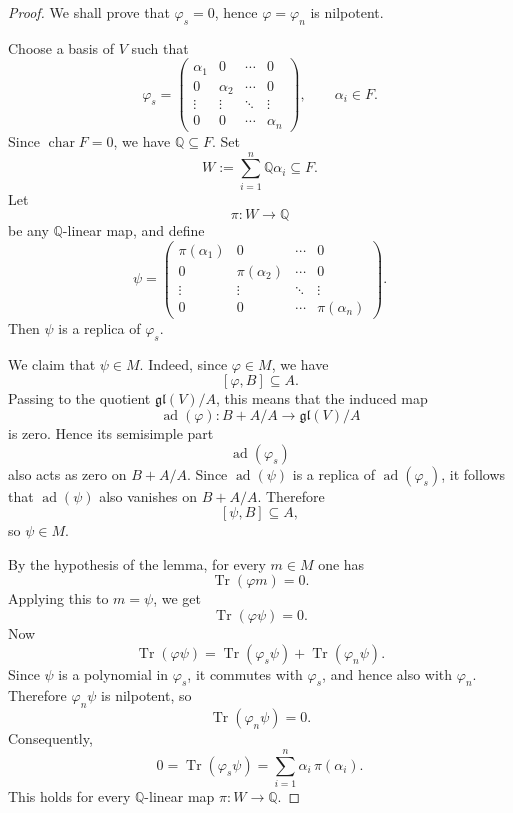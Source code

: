 \begin{proof}
    We shall prove that $\varphi_s=0$, hence $\varphi=\varphi_n$ is nilpotent.

    Choose a basis of $V$ such that
    \[
        \varphi_s=
        \begin{pmatrix}
            \alpha_1 & 0        & \cdots & 0        \\
            0        & \alpha_2 & \cdots & 0        \\
            \vdots   & \vdots   & \ddots & \vdots   \\
            0        & 0        & \cdots & \alpha_n
        \end{pmatrix},
        \qquad \alpha_i\in F.
    \]
    Since $\operatorname{char}F=0$, we have $\mathbb{Q}\subseteq F$. Set
    \[
        W:=\sum_{i=1}^n \mathbb{Q}\alpha_i\subseteq F.
    \]
    Let
    \[
        \pi:W\to \mathbb{Q}
    \]
    be any $\mathbb{Q}$-linear map, and define
    \[
        \psi=
        \begin{pmatrix}
            \pi(\alpha_1) & 0             & \cdots & 0             \\
            0             & \pi(\alpha_2) & \cdots & 0             \\
            \vdots        & \vdots        & \ddots & \vdots        \\
            0             & 0             & \cdots & \pi(\alpha_n)
        \end{pmatrix}.
    \]
    Then $\psi$ is a replica of $\varphi_s$.

    We claim that $\psi\in M$. Indeed, since $\varphi\in M$, we have
    \[
        [\varphi,B]\subseteq A.
    \]
    Passing to the quotient $\mathfrak{gl}(V)/A$, this means that the induced map
    \[
        \operatorname{ad}(\varphi):B+A/A\to \mathfrak{gl}(V)/A
    \]
    is zero. Hence its semisimple part
    \[
        \operatorname{ad}(\varphi_s)
    \]
    also acts as zero on $B+A/A$. Since $\operatorname{ad}(\psi)$ is a replica of $\operatorname{ad}(\varphi_s)$, it follows that $\operatorname{ad}(\psi)$ also vanishes on $B+A/A$. Therefore
    \[
        [\psi,B]\subseteq A,
    \]
    so $\psi\in M$.

    By the hypothesis of the lemma, for every $m\in M$ one has
    \[
        \operatorname{Tr}(\varphi m)=0.
    \]
    Applying this to $m=\psi$, we get
    \[
        \operatorname{Tr}(\varphi\psi)=0.
    \]
    Now
    \[
        \operatorname{Tr}(\varphi\psi)
        =
        \operatorname{Tr}(\varphi_s\psi)+\operatorname{Tr}(\varphi_n\psi).
    \]
    Since $\psi$ is a polynomial in $\varphi_s$, it commutes with $\varphi_s$, and hence also with $\varphi_n$. Therefore $\varphi_n\psi$ is nilpotent, so
    \[
        \operatorname{Tr}(\varphi_n\psi)=0.
    \]
    Consequently,
    \[
        0=\operatorname{Tr}(\varphi_s\psi)=\sum_{i=1}^n \alpha_i\,\pi(\alpha_i).
    \]
    This holds for every $\mathbb{Q}$-linear map $\pi:W\to\mathbb{Q}$.


\end{proof}
